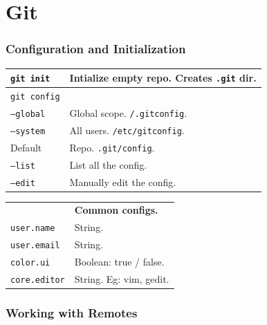 \section{Git}


\subsubsection*{Configuration and Initialization}

\begin{tabularx}{\linewidth}{lX}
    \texttt{git init}       & Intialize empty repo. Creates \texttt{.git} dir.\\
\hline
   \texttt{git config}      & \\
   \texttt{--global}        & Global scope. \texttt{/.gitconfig}.\\
   \texttt{--system}        & All users. \texttt{/etc/gitconfig}.\\
   Default                  & Repo. \texttt{.git/config}.\\
   \texttt{--list}          & List all the config.\\
   \texttt{--edit}          & Manually edit the config.\\
\hline
\end{tabularx}

\begin{tabularx}{\linewidth}{lX}
                            & \textbf{Common configs.}\\ 
    \texttt{user.name}      & String.\\ 
    \texttt{user.email}     & String.\\
    \texttt{color.ui}       & Boolean: true / false.\\
    \texttt{core.editor}    & String. Eg: vim, gedit.\\
\hline
\end{tabularx}


\subsubsection*{Working with Remotes}

